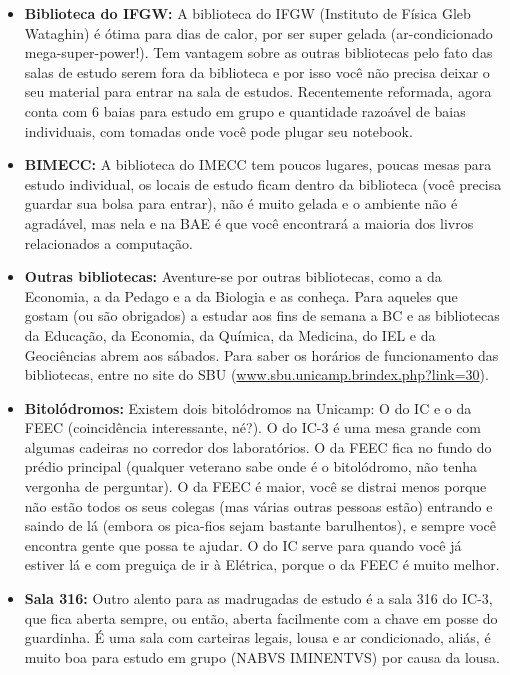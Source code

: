 \begin{itemize}
    \item  \textbf{Biblioteca do IFGW:} A biblioteca do IFGW (Instituto de Física
    Gleb Wataghin) é ótima para dias de calor, por ser super gelada (ar-condicionado
    mega-super-power!). Tem vantagem sobre as outras bibliotecas pelo fato das salas
    de estudo serem fora da biblioteca e por isso você não precisa deixar o seu
    material para entrar na sala de estudos. Recentemente reformada, agora conta
    com 6 baias para estudo em grupo e quantidade razoável de baias individuais, com tomadas
    onde você pode plugar seu notebook.

    \item  \textbf{BIMECC:} A biblioteca do IMECC tem poucos lugares, poucas
    mesas para estudo individual, os locais de estudo ficam dentro da biblioteca
    (você precisa guardar sua bolsa para entrar), não é muito gelada
    e o ambiente não é agradável, mas nela e na BAE é que você encontrará
    a maioria dos livros relacionados a computação.

    \item  \textbf{Outras bibliotecas:} Aventure-se por outras bibliotecas, como
    a da Economia, a da Pedago e a da Biologia e as conheça. Para aqueles que
    gostam (ou são obrigados) a estudar aos fins de semana a BC e as bibliotecas
    da Educação, da Economia, da Química, da Medicina, do IEL e da Geociências
    abrem aos sábados. Para saber os horários de funcionamento das bibliotecas,
    entre no site do SBU (\url{www.sbu.unicamp.brindex.php?link=30}).

    \item  \textbf{Bitolódromos:} Existem dois bitolódromos na Unicamp: O do IC
    e o da FEEC (coincidência interessante, né?). O do IC-3 é uma mesa grande
    com algumas cadeiras no corredor dos laboratórios. O da FEEC fica no fundo do
    prédio principal (qualquer veterano sabe onde é o bitolódromo, não tenha
    vergonha de perguntar). O da FEEC é maior, você se distrai menos porque não
    estão todos os seus colegas (mas várias outras pessoas estão) entrando
    e saindo de lá (embora os pica-fios sejam bastante barulhentos), e sempre
    você encontra gente que possa te ajudar. O do IC serve para quando você já
    estiver lá e com preguiça de ir à Elétrica, porque o da FEEC é muito melhor.

    \item  \textbf{Sala 316:} Outro alento para as madrugadas de estudo é a sala
    316 do IC-3, que fica aberta sempre, ou então, aberta facilmente com a chave
    em posse do guardinha. É uma sala com carteiras legais, lousa e ar
    condicionado, aliás, é muito boa para estudo em grupo (NABVS IMINENTVS) por
    causa da lousa.


\end{itemize}
